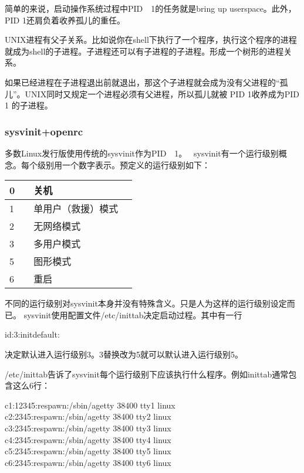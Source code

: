 简单的来说，启动操作系统过程中PID　1的任务就是bring up userspace。此外，PID 1还肩负着收养孤儿的重任。

\begin{insertnote}
UNIX进程有父子关系。比如说你在shell下执行了一个程序，执行这个程序的进程就成为shell的子进程。子进程还可以有子进程的子进程。形成一个树形的进程关系。
\end{insertnote}

如果已经进程在子进程退出前就退出，那这个子进程就会成为没有父进程的“孤儿”。UNIX同时又规定一个进程必须有父进程，所以孤儿就被 PID 1收养成为PID 1 的子进程。


\subsubsection{sysvinit+openrc}

多数Linux发行版使用传统的sysvinit作为PID　1。　
sysvinit有一个运行级别概念。每个级别用一个数字表示。预定义的运行级别如下：

\begin{longtable}{|l|p{}|}\hline
0　& 关机\\\hline
1 & 单用户（救援）模式　\\\hline
2 & 无网络模式　\\\hline
3 & 多用户模式　\\\hline
5 & 图形模式　\\\hline
6 & 重启　\\\hline
\end{longtable}

不同的运行级别对sysvinit本身并没有特殊含义。只是人为这样的运行级别设定而已。
sysvinit使用配置文件/etc/inittab决定启动过程。其中有一行
\begin{code}
id:3:initdefault:
\end{code}
决定默认进入运行级别3。3替换改为5就可以默认进入运行级别5。

/etc/inittab告诉了sysvinit每个运行级别下应该执行什么程序。例如inittab通常包含这么6行：
\begin{code}
c1:12345:respawn:/sbin/agetty 38400 tty1 linux\\
c2:2345:respawn:/sbin/agetty 38400 tty2 linux\\
c3:2345:respawn:/sbin/agetty 38400 tty3 linux\\
c4:2345:respawn:/sbin/agetty 38400 tty4 linux\\
c5:2345:respawn:/sbin/agetty 38400 tty5 linux\\
c6:2345:respawn:/sbin/agetty 38400 tty6 linux
\end{code}

